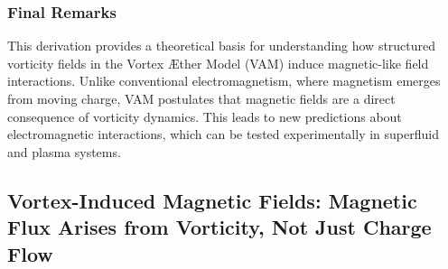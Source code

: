 \documentclass[a4paper,10pt]{article}
\begin{document}
\subsubsection*{Final Remarks}
This derivation provides a theoretical basis for understanding how structured vorticity fields in the Vortex Æther Model (VAM) induce magnetic-like field interactions. Unlike conventional electromagnetism, where magnetism emerges from moving charge, VAM postulates that magnetic fields are a direct consequence of vorticity dynamics. This leads to new predictions about electromagnetic interactions, which can be tested experimentally in superfluid and plasma systems.

    

\subsection{Vortex-Induced Magnetic Fields: Magnetic Flux Arises from Vorticity, Not Just Charge Flow}\label{subsec:vortex-induced-magnetic-fields:-magnetic-flux-arises-from-vorticity-not-just-charge-flow}

\begin{abstract}
    This study presents a rigorous reformulation of \textbf{electromagnetic field generation}  in the \textbf{Vortex Æther Model (VAM)} , wherein magnetic flux arises not solely from moving electric charges but also from \textbf{structured vorticity fields}  in an inviscid, incompressible medium. While classical electrodynamics attributes magnetic fields to current flow and time-dependent electric fields, VAM proposes that \textbf{magnetic fields are a direct consequence of vorticity conservation and rotational dynamics} . By extending \textbf{Kelvin's vortex dynamics} , \textbf{Helmholtz's vorticity conservation laws} , and \textbf{Maxwell's electrodynamics} , we derive modified \textbf{tensorial field equations}  integrating vorticity-driven magnetic induction. These formulations propose that \textbf{self-sustained magnetic flux structures can emerge within plasmonic systems, superfluid vortices, and astrophysical plasma configurations} , leading to potential experimental validations that challenge the classical charge-based paradigm of electromagnetism.
\end{abstract}
\end{document}
